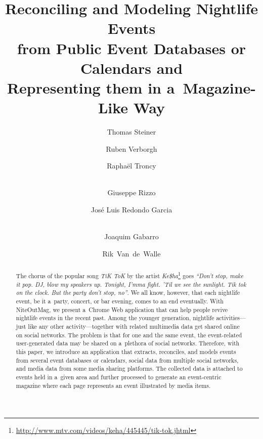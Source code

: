 \documentclass[runningheads,a4paper]{llncs}
\begin{document}
\title{Reconciling and Modeling Nightlife Events\\ from Public Event Databases or Calendars and\\ Representing them in a~Magazine-Like Way}


\author{Thomas Steiner \and
		Ruben Verborgh \and
        Rapha\"el Troncy \and\\
		Giuseppe Rizzo \and
		José Luis Redondo Garcia \and	\\
		Joaquim Gabarro \and 
		Rik~Van~de~Walle		
}


\maketitle
\setcounter{footnote}{0}

\begin{abstract}
The chorus of the popular song \emph{TiK ToK} by the artist \emph{Ke\$ha}\footnote{\url{http://www.mtv.com/videos/keha/445445/tik-tok.jhtml}} goes \emph{``Don't stop, make it pop. DJ, blow my speakers up. Tonight, I'mma fight. 'Til we see the sunlight. Tik tok on the clock. But the party don't stop, no''}. We all know, however, that each nightlife event, be it a~party, concert, or bar evening, comes to an end eventually. With NiteOutMag, we present a~Chrome Web application that can help people revive nightlife events in the recent past. Among the younger generation, nightlife activities---just like any other activity---together with related multimedia data get shared online on social networks. The problem is that for one and the same event, the event-related user-generated data may be shared on a~plethora of social networks. Therefore, with this paper, we introduce an application that extracts, reconciles, and models events from several event databases or calendars, social data from multiple social networks, and media data from some media sharing platforms. The collected data is attached to events held in a~given area and further processed to generate an event-centric magazine where each page represents an event illustrated by media items.
\end{abstract}
\end{document}
